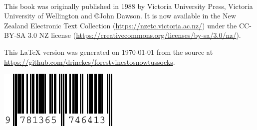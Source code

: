 \thispagestyle{empty}

~\vfill

This book was originally published in 1988 by Victoria University Press, Victoria University of Wellington and ©John Dawson.
It is now available in the New Zealand Electronic Text Collection (\url{https://nzetc.victoria.ac.nz/}) under the CC-BY-SA 3.0 NZ license (\url{https://creativecommons.org/licenses/by-sa/3.0/nz/}).

This \LaTeX{} version was generated on \today{} from the source at \url{https://github.com/drinckes/forestvinestosnowtussocks}.

\vspace{2em}
\includegraphics{graphics/isbn.pdf}
